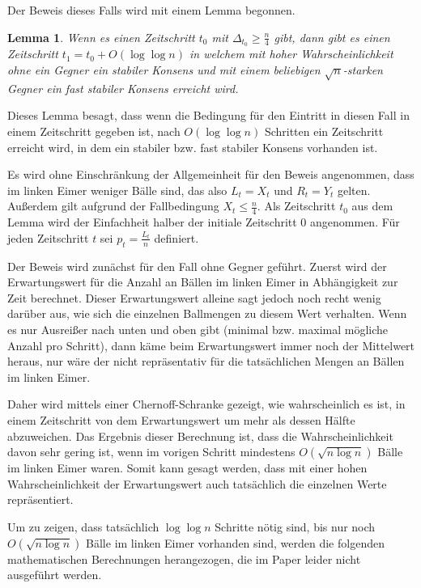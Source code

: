\documentclass[12pt,ngerman,a4paper]{scrartcl}
\theoremstyle{plain}
\newtheorem{lemma}[theorem]{Lemma}
\theoremstyle{definition}
\theoremstyle{remark}
\begin{document}
Der Beweis dieses Falls wird mit einem Lemma begonnen.

\begin{lemma}
Wenn es einen Zeitschritt $t_0$ mit $\Delta_{t_0} \geq \frac{n}{4}$ gibt,
dann gibt es einen Zeitschritt $t_1 = t_0 + O(\log \log n)$ in welchem mit
hoher Wahrscheinlichkeit ohne ein Gegner ein stabiler Konsens und mit einem
beliebigen $\sqrt{n}$-starken Gegner ein fast stabiler Konsens erreicht wird.
\end{lemma}

Dieses Lemma besagt, dass wenn die Bedingung für den Eintritt in diesen Fall
in einem Zeitschritt gegeben ist, nach $O(\log \log n)$ Schritten ein Zeitschritt
erreicht wird, in dem ein stabiler bzw. fast stabiler Konsens vorhanden ist.

Es wird ohne Einschränkung der Allgemeinheit für den Beweis angenommen, dass im
linken Eimer weniger Bälle sind, das also $L_t = X_t$ und $R_t = Y_t$ gelten.
Außerdem gilt aufgrund der Fallbedingung $X_t \leq \frac{n}{4}$. Als Zeitschritt
$t_0$ aus dem Lemma wird der Einfachheit halber der initiale Zeitschritt $0$
angenommen. Für jeden Zeitschritt $t$ sei $p_t = \frac{L_t}{n}$ definiert.

Der Beweis wird zunächst für den Fall ohne Gegner geführt. Zuerst wird der
Erwartungswert für die Anzahl an Bällen im linken Eimer in Abhängigkeit zur Zeit
berechnet. Dieser Erwartungswert alleine sagt jedoch noch recht wenig darüber aus,
wie sich die einzelnen Ballmengen zu diesem Wert verhalten. Wenn es nur Ausreißer
nach unten und oben gibt (minimal bzw. maximal mögliche Anzahl pro Schritt),
dann käme beim Erwartungswert immer noch der Mittelwert heraus, nur wäre der
nicht repräsentativ für die tatsächlichen Mengen an Bällen im linken Eimer.

Daher wird mittels einer Chernoff-Schranke gezeigt, wie wahrscheinlich es ist,
in einem Zeitschritt von dem Erwartungswert um mehr als dessen Hälfte abzuweichen.
Das Ergebnis dieser Berechnung ist, dass die Wahrscheinlichkeit davon sehr gering
ist, wenn im vorigen Schritt mindestens $O(\sqrt{n \log n})$ Bälle im linken
Eimer waren. Somit kann gesagt werden, dass mit einer hohen Wahrscheinlichkeit
der Erwartungswert auch tatsächlich die einzelnen Werte repräsentiert.

Um zu zeigen, dass tatsächlich $\log \log n$ Schritte nötig sind, bis nur noch
$O(\sqrt{n \log n})$ Bälle im linken Eimer vorhanden sind, werden die folgenden
mathematischen Berechnungen herangezogen, die im Paper leider nicht ausgeführt
werden.
\end{document}
